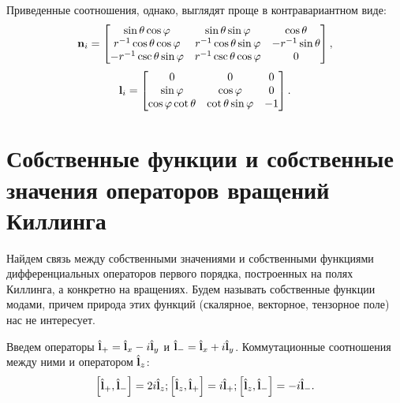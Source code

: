\documentclass[12pt,a4paper]{article}
\begin{document}
        Приведенные соотношения, однако, выглядят проще в контравариантном виде:
        \begin{equation}
            \mathbf{n}_i
            =
            \begin{bmatrix}
                \sin\theta \cos\varphi          & \sin\theta \sin\varphi        & \cos\theta \\
                r^{-1} \cos\theta \cos\varphi   & r^{-1} \cos\theta \sin\varphi & - r^{-1} \sin\theta \\
                - r^{-1} \csc\theta \sin\varphi & r^{-1} \csc\theta \cos\varphi & 0
            \end{bmatrix}
            ,
        \end{equation}
        \begin{equation}
            \mathbf{l}_i
            =
            \begin{bmatrix}
                0
                    & 0
                    & 0 \\
                \sin\varphi
                    & \cos\varphi
                    & 0 \\
                \cos\varphi \cot\theta
                    & \cot\theta \sin\varphi
                    & - 1
            \end{bmatrix}
            .
        \end{equation}


    \section{Собственные функции и собственные значения операторов вращений Киллинга}

        Найдем связь между собственными значениями и собственными функциями дифференциальных операторов первого порядка, построенных на полях Киллинга, а конкретно на вращениях. Будем называть собственные функции модами, причем природа этих функций (скалярное, векторное, тензорное поле) нас не интересует.

        Введем операторы $\hat{\mathbf{l}}_{+} = \hat{\mathbf{l}}_x - i\hat{\mathbf{l}}_y$ и $\hat{\mathbf{l}}_{-} = \hat{\mathbf{l}}_x + i\hat{\mathbf{l}}_y$. Коммутационные соотношения между ними и оператором $\hat{\mathbf{l}}_z$:
        \begin{equation}
            \left[ \hat{\mathbf{l}}_{+}, \hat{\mathbf{l}}_{-} \right] = 2 i \hat{\mathbf{l}}_{z} ;
            \left[ \hat{\mathbf{l}}_{z}, \hat{\mathbf{l}}_{+} \right] =   i \hat{\mathbf{l}}_{+} ;
            \left[ \hat{\mathbf{l}}_{z}, \hat{\mathbf{l}}_{-} \right] = - i \hat{\mathbf{l}}_{-} .
        \end{equation}
\end{document}
